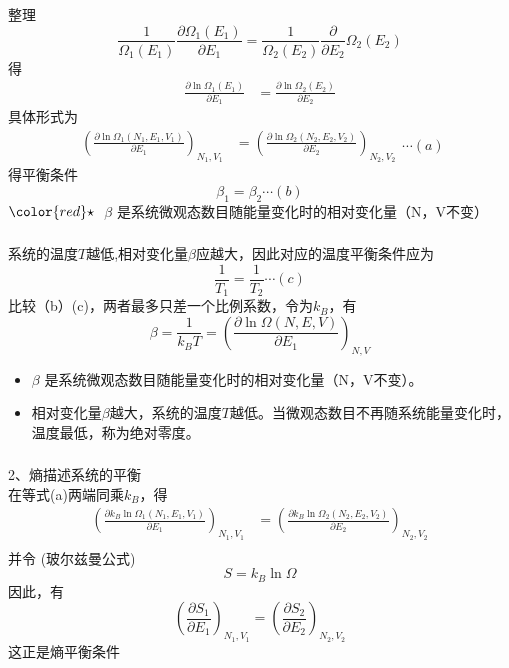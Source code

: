 \begin{frame}
  \frametitle{}
整理
$$
 \frac{1}{\Omega _1 (E_1) }\frac{\partial \Omega _1 (E_1) }{\partial E_1 }  = \frac{1}{\Omega _2 (E_2)} \frac{\partial }{\partial E_2 }\Omega _2 (E_2) 
$$ 
得
$$
\begin{aligned}
\frac{\partial \ln \Omega _1 (E_1) }{\partial E_1 }  &= \frac{\partial \ln \Omega _2 (E_2)}{\partial E_2 }  \end{aligned}
$$
具体形式为 
$$
\begin{aligned}
\left(\frac{\partial \ln \Omega _1 (N_1,E_1,V_1) }{\partial E_1 }\right)_{N_1,V_1}  &= \left(\frac{\partial \ln \Omega _2 (N_2,E_2,V_2)}{\partial E_2 } \right)_{N_2,V_2}  
\end{aligned} \cdots (a)$$ 
得平衡条件 
\[ \beta _1 = \beta _2 \cdots (b)\]
${\color{red}\star}~$ $\beta $ 是系统微观态数目随能量变化时的相对变化量（N，V不变）
\end{frame} 

\begin{frame}[label=current]
  \frametitle{}
  系统的温度$T$越低,相对变化量$\beta $应越大，因此对应的温度平衡条件应为
  \[\frac{1}{T_1} = \frac{1}{T_2} \cdots (c)\]
  比较（b）(c)，两者最多只差一个比例系数，令为$k_B$，有
  \[ \boxed{\beta = \frac{1}{ k_B T} = \left(\frac{\partial \ln \Omega (N,E,V) }{\partial E_1 }\right)_{N,V}}\]
  \begin{itemize}
    \item $\beta $ 是系统微观态数目随能量变化时的相对变化量（N，V不变）。
    \item 相对变化量$\beta $越大，系统的温度$T$越低。当微观态数目不再随系统能量变化时，温度最低，称为绝对零度。
  \end{itemize}
\end{frame} 


\begin{frame}
  \frametitle{}
  2、熵描述系统的平衡\\
  在等式(a)两端同乘$k_B$，得
  $$
  \begin{aligned}
  \left(\frac{\partial k_B \ln \Omega _1 (N_1,E_1,V_1) }{\partial E_1 }\right)_{N_1,V_1}  &= \left(\frac{\partial k_B \ln \Omega _2 (N_2,E_2,V_2)}{\partial E_2 } \right)_{N_2,V_2}  \\
  \end{aligned}$$ 
  并令 (玻尔兹曼公式)
  \[ \boxed{S = k_B \ln \Omega}  \]
  因此，有
  \[\left(\frac{\partial S_1 }{\partial E_1 }\right)_{N_1,V_1}  = \left(\frac{\partial S_2}{\partial E_2 } \right)_{N_2,V_2} \]
  这正是熵平衡条件
\end{frame} 

